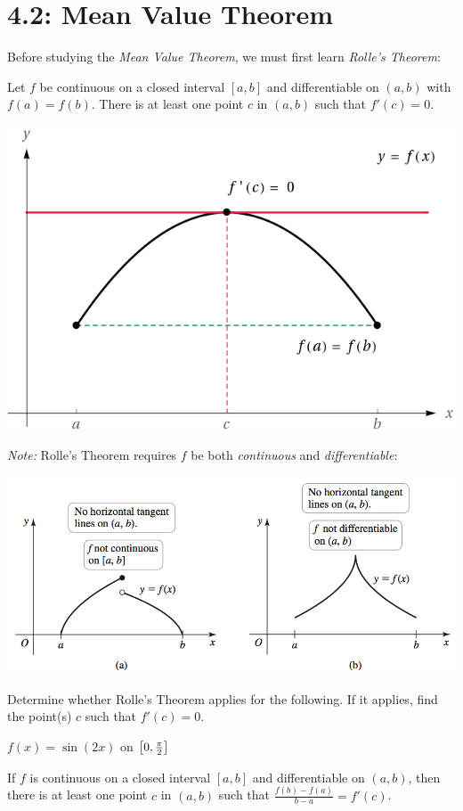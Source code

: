 \documentclass[mathNotesPreamble]{subfiles}
\begin{document}
\section{4.2: Mean Value Theorem}
Before studying the \textit{Mean Value Theorem}, we must first learn \textit{Rolle's Theorem}:\\

\begin{thmBox*}
  Let $f$ be continuous on a closed interval $[a,b]$ and differentiable on $(a,b)$ with $f(a)=f(b)$. There is at least one point $c$ in $(a,b)$ such that $f'(c)=0$.
\end{thmBox*}

\begin{center}
  \includegraphics[width=0.3\linewidth]{images/briggs_04_02/RollesThm01.png}
\end{center}

\textit{Note:} Rolle's Theorem requires $f$ be both \textit{continuous} and \textit{differentiable}:
\begin{center}
  \includegraphics[width=0.6\linewidth]{images/briggs_04_02/RollesThm02.png}
\end{center}

\begin{ex*}
  Determine whether Rolle's Theorem applies for the following. If it applies, find the point(s) $c$ such that $f'(c)=0$.
\end{ex*}
$f(x)=\sin(2x)$ on ${\left[0, \frac{\pi}{2}\right]}$
\pagebreak

\begin{thmBox*}
  If $f$ is continuous on a closed interval $[a,b]$ and differentiable on $(a,b)$, then there is at least one point $c$ in $(a,b)$ such that 
$\frac{f(b)-f(a)}{b-a}=f'(c)$.
\end{thmBox*}
\end{document}
